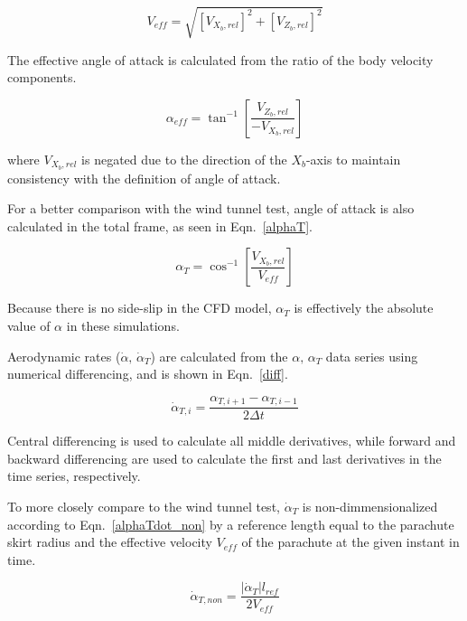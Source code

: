 \documentclass[]{aiaa-tc}%
\begin{document}
\newcommand\Vxb{V_{X_b,rel}}
\newcommand\Vzb{V_{Z_b,rel}}

\begin{equation} \label{Veff}
V_{eff} = \sqrt{\left[\Vxb      \right]^2
              + \left[\Vzb \right]^2}
\end{equation}

The effective angle of attack is calculated from the ratio of the body velocity components.

\begin{equation} \label{Aeff}
\alpha_{eff} = \tan^{-1} \left[ \frac{\Vzb}{-\Vxb} \right]
\end{equation}

\noindent where $V_{X_b,rel}$ is negated due to the direction of the $X_b$-axis to maintain consistency with the definition of angle of attack.

For a better comparison with the wind tunnel test, angle of attack is also calculated in the total frame, as seen in Eqn.~\ref{alphaT}.

\begin{equation} \label{alphaT}
 \alpha_{T} = \cos^{-1} \left[ \frac{\Vxb}{V_{eff}} \right]
\end{equation}

\noindent Because there is no side-slip in the CFD model, $\alpha_T$ is effectively the absolute value of $\alpha$ in these simulations.

Aerodynamic rates ($\dot{\alpha},\,\dot{\alpha}_T$) are calculated from the $\alpha,\,\alpha_T$ data series using numerical differencing, and is shown in Eqn.~\ref{diff}.

\begin{equation} \label{diff}
 \dot{\alpha}_{T,i} = \frac{\alpha_{T,i+1} - \alpha_{T,i-1}}{2\Delta t}
\end{equation}

\noindent Central differencing is used to calculate all middle derivatives, while forward and backward differencing are used to calculate the first and last derivatives in the time series, respectively.

To more closely compare to the wind tunnel test, $\dot{\alpha}_T$ is non-dimmensionalized according to Eqn.~\ref{alphaTdot_non} by a reference length equal to the parachute skirt radius and the effective velocity $V_{eff}$ of the parachute at the given instant in time.

\begin{equation} \label{alphaTdot_non}
 \dot{\alpha}_{T,non} = \frac{|\dot{\alpha}_T| l_{ref}}{2V_{eff}}
\end{equation}
\end{document}
